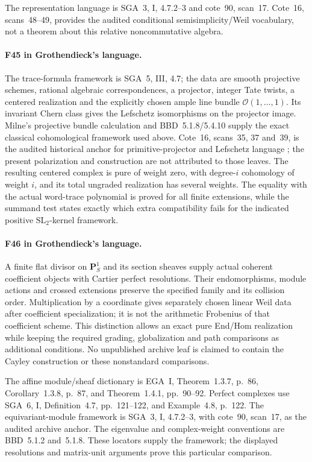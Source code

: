 \documentclass[11pt,a4paper]{article}
\newcommand{\fid}[1]{\textsf{#1}}\newcommand{\gate}[1]{\textsf{#1}}
\theoremstyle{named}\newtheorem{finding}{Finding}[section]
\theoremstyle{definition}\newtheorem{definition}[finding]{Definition}
\theoremstyle{remark}\newtheorem{remark}[finding]{Remark}
\begin{document}
The representation language is SGA~3, I, 4.7.2--3 and
cote~90, scan~17. Cote~16, scans~48--49, provides the
audited conditional semisimplicity/Weil vocabulary, not
a theorem about this relative noncommutative algebra.



\paragraph{\fid{F45} in Grothendieck's language.}
The trace-formula framework is SGA~5, III, 4.7; the data
are smooth projective schemes, rational algebraic
correspondences, a projector, integer Tate twists, a centered
realization and the explicitly chosen ample line bundle
$\mathcal O(1,\ldots,1)$. Its invariant Chern class gives the
Lefschetz isomorphisms on the projector image. Milne's projective
bundle calculation and BBD~5.1.8/5.4.10 supply the exact classical
cohomological framework used above. Cote~16, scans~35, 37 and~39,
is the audited historical anchor for primitive-projector and
Lefschetz language \cite{Archive}; the present polarization and
construction are not attributed to those leaves.
The resulting centered complex is pure of weight zero, with
degree-$i$ cohomology of weight $i$, and its total ungraded
realization has several weights. The equality with the actual
word-trace polynomial is proved for all finite extensions, while
the summand test states exactly which extra compatibility fails
for the indicated positive $\mathrm{SL}_2$-kernel framework.


\paragraph{\fid{F46} in Grothendieck's language.}
A finite flat divisor on $\mathbf P^1_S$ and its section
sheaves supply actual coherent coefficient objects with
Cartier perfect resolutions. Their endomorphisms, module
actions and crossed extensions preserve the specified
family and its collision order. Multiplication by a
coordinate gives separately chosen linear Weil data after
coefficient specialization; it is not the arithmetic
Frobenius of that coefficient scheme. This distinction
allows an exact pure End/Hom realization while keeping the
required grading, globalization and path comparisons as
additional conditions. No unpublished archive leaf is
claimed to contain the Cayley construction or these
nonstandard comparisons.

The affine module/sheaf dictionary is EGA~I, Theorem~1.3.7,
p.~86, Corollary~1.3.8, p.~87, and Theorem~1.4.1,
pp.~90--92. Perfect complexes use SGA~6, I, Definition~4.7,
pp.~121--122, and Example~4.8, p.~122. The equivariant-module
framework is SGA~3, I, 4.7.2--3, with cote~90, scan~17,
as the audited archive anchor. The eigenvalue and complex-weight
conventions are BBD~5.1.2 and~5.1.8. These locators supply
the framework; the displayed resolutions and matrix-unit
arguments prove this particular comparison.
\end{document}
